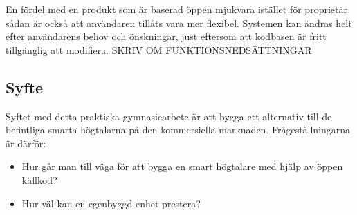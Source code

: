 En fördel med en produkt som är baserad öppen mjukvara istället för proprietär sådan är också att användaren tillåts vara mer flexibel. Systemen kan ändras helt efter användarens behov och önskningar, just eftersom att kodbasen är fritt tillgänglig att modifiera. SKRIV OM FUNKTIONSNEDSÄTTNINGAR

\subsection{Syfte}
Syftet med detta praktiska gymnasiearbete är att bygga ett alternativ till de befintliga smarta högtalarna på den kommersiella marknaden. Frågeställningarna är därför: 
\begin{itemize}
\item Hur går man till väga för att bygga en smart högtalare med hjälp av öppen källkod?
\item Hur väl kan en egenbyggd enhet prestera?
\end{itemize}
